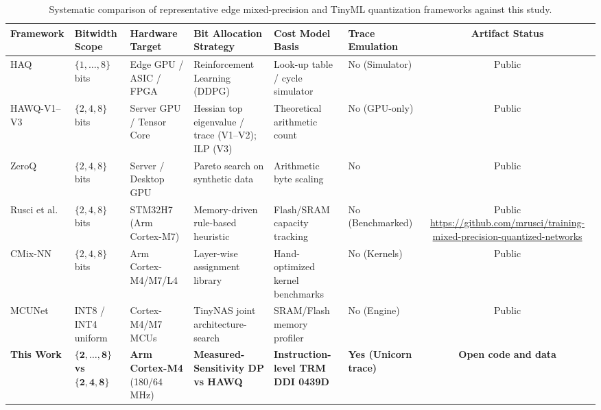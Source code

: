 \begin{table}[!t]
\centering
\caption{Systematic comparison of representative edge mixed-precision and TinyML quantization frameworks against this study.}
\label{tab:frameworks_comparison}
\scriptsize

\begin{tabularx}{\textwidth}{l p{2.0cm} p{2.2cm} X p{2.2cm} p{1.6cm} c}
\toprule
\textbf{Framework} & \textbf{Bitwidth Scope} & \textbf{Hardware Target} & \textbf{Bit Allocation Strategy} & \textbf{Cost Model Basis} & \textbf{Trace Emulation} & \textbf{Artifact Status} \\
\midrule
HAQ~\cite{wang2019haq} & $\{1, \dots, 8\}$ bits & Edge GPU / ASIC / FPGA & Reinforcement Learning (DDPG) & Look-up table / cycle simulator & No (Simulator) & Public \\
HAWQ-V1--V3~\cite{dong2019hawq, dong2020hawqv2, yao2021hawqv3} & $\{2, 4, 8\}$ bits & Server GPU / Tensor Core & Hessian top eigenvalue / trace (V1--V2); ILP (V3) & Theoretical arithmetic count & No (GPU-only) & Public \\
ZeroQ~\cite{cai2020zeroq} & $\{2, 4, 8\}$ bits & Server / Desktop GPU & Pareto search on synthetic data & Arithmetic byte scaling & No & Public \\
Rusci et al.~\cite{rusci2020quantization} & $\{2, 4, 8\}$ bits & STM32H7 (Arm Cortex-M7) & Memory-driven rule-based heuristic & Flash/SRAM capacity tracking & No (Benchmarked) & \parbox{2.4cm}{\raggedright Public \url{https://github.com/mrusci/training-mixed-precision-quantized-networks}} \\
CMix-NN~\cite{capotondi2020cmixnn} & $\{2, 4, 8\}$ bits & Arm Cortex-M4/M7/L4 & Layer-wise assignment library & Hand-optimized kernel benchmarks & No (Kernels) & Public \\
MCUNet~\cite{lin2020mcunet} & INT8 / INT4 uniform & Cortex-M4/M7 MCUs & TinyNAS joint architecture-search & SRAM/Flash memory profiler & No (Engine) & Public \\
\textbf{This Work} & $\mathbf{\{2, \dots, 8\}}$ \textbf{vs} $\mathbf{\{2, 4, 8\}}$ & \textbf{Arm Cortex-M4} (180/64\,MHz) & \textbf{Measured-Sensitivity DP vs HAWQ} & \textbf{Instruction-level TRM DDI 0439D} & \textbf{Yes (Unicorn trace)} & \textbf{Open code and data} \\
\bottomrule
\end{tabularx}%
\end{table}
